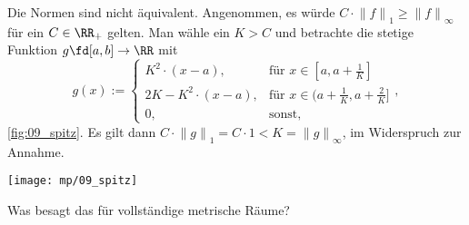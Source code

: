 \begin{antwort}
  Die Normen sind nicht äquivalent. Angenommen, 
  es würde $C\cdot {\|f\|}_1 \ge  {\|f\|}_\infty$ 
  für ein $C\in \RR_+$ 
  gelten. Man wähle ein $K>C$ und betrachte
  die stetige Funktion $g \fd [a,b]\to\RR$ mit 
  \[
  g(x) :=  \left\{\begin{array}{ll}
      K^2 \cdot (x-a),   & \text{für $x\in [a,a+\frac{1}{K}]$}  \\
      2K-K^2\cdot (x-a), & \text{für $x\in (a+\frac{1}{K},a+\frac{2}{K}]$} \\
      0, & \text{sonst,}
    \end{array} \right.,
  \]
  \sieheAbbildung\ref{fig:09_spitz}.  Es gilt dann 
  $C\cdot {\| g \|}_1 = C \cdot 1 < K  = {\| g \|}_\infty$, im 
  Widerspruch zur Annahme.
  \AntEnd

  \begin{center}
    \texttt{[image: mp/09\_spitz]}
    \label{fig:09_spitz}
  \end{center}
\end{antwort}

\begin{frage}
  Was besagt das  für vollständige 
  metrische Räume?
\end{frage}

